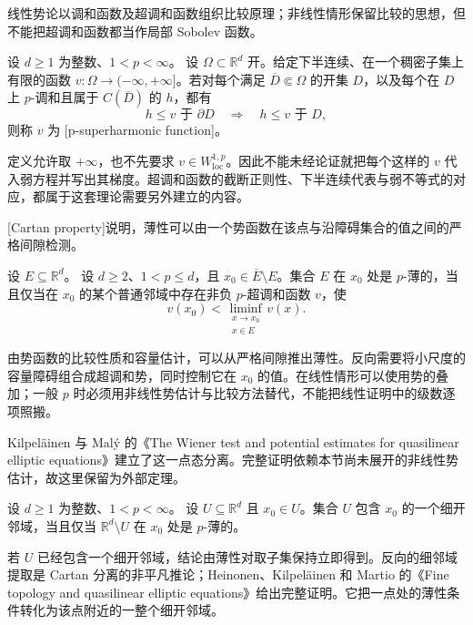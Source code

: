 线性势论以调和函数及超调和函数组织比较原理；非线性情形保留比较的思想，但不能把超调和函数都当作局部 Sobolev 函数。

\begin{definition}\label{b1:def:p-superharmonic}
设 \(d\geq1\) 为整数、\(1<p<\infty\)。
设 \(\Omega\subset\mathbb R^d\) 开。给定下半连续、在一个稠密子集上有限的函数 \(v\colon\Omega\to(-\infty,+\infty]\)。若对每个满足 \(\overline D\Subset\Omega\) 的开集 \(D\)，以及每个在 \(D\) 上 \(p\)-调和且属于 \(C(\overline D)\) 的 \(h\)，都有
\[
 h\le v\text{ 于 }\partial D
 \quad\Longrightarrow\quad h\le v\text{ 于 }D,
\]
则称 \(v\) 为 [p-superharmonic function]。
\end{definition}

定义允许取 \(+\infty\)，也不先要求 \(v\in W_{\mathrm{loc}}^{1,p}\)。因此不能未经论证就把每个这样的 \(v\) 代入弱方程并写出其梯度。超调和函数的截断正则性、下半连续代表与弱不等式的对应，都属于这套理论需要另外建立的内容。

\ProseParagraphBreak

[Cartan property]说明，薄性可以由一个势函数在该点与沿障碍集合的值之间的严格间隙检测。
\begin{theorem}[Cartan 分离]\label{b1:thm:p-cartan-characterization}
设 \(E\subseteq\mathbb R^d\)。
设 \(d\ge2\)、\(1<p\le d\)，且 \(x_0\in\overline E\setminus E\)。集合 \(E\) 在 \(x_0\) 处是 \(p\)-薄的，当且仅当在 \(x_0\) 的某个普通邻域中存在非负 \(p\)-超调和函数 \(v\)，使
\[
 v(x_0)<
 \liminf_{\substack{x\to x_0\\x\in E}}v(x).
\]
\end{theorem}
\begin{proofsketch}
由势函数的比较性质和容量估计，可以从严格间隙推出薄性。反向需要将小尺度的容量障碍组合成超调和势，同时控制它在 \(x_0\) 的值。在线性情形可以使用势的叠加；一般 \(p\) 时必须用非线性势估计与比较方法替代，不能把线性证明中的级数逐项照搬。

Kilpeläinen 与 Malý 的《The Wiener test and potential estimates for quasilinear elliptic equations》\cite[THEOREM 1.3 and Section 5]{Kilpelainen1994Wiener}建立了这一点态分离。完整证明依赖本节尚未展开的非线性势估计，故这里保留为外部定理。
\end{proofsketch}

\begin{corollary}[细邻域刻画]\label{b1:cor:p-fine-neighborhood-characterization}
设 \(d\geq1\) 为整数、\(1<p<\infty\)。
设 \(U\subseteq\mathbb R^d\) 且 \(x_0\in U\)。集合 \(U\) 包含 \(x_0\) 的一个细开邻域，当且仅当 \(\mathbb R^d\setminus U\) 在 \(x_0\) 处是 \(p\)-薄的。
\end{corollary}
\begin{proofsketch}
若 \(U\) 已经包含一个细开邻域，结论由薄性对取子集保持立即得到。反向的细邻域提取是 Cartan 分离的非平凡推论；Heinonen、Kilpeläinen 和 Martio 的《Fine topology and quasilinear elliptic equations》\cite[3.2. THEOREM]{Heinonen1989Fine}给出完整证明。它把一点处的薄性条件转化为该点附近的一整个细开邻域。
\end{proofsketch}

